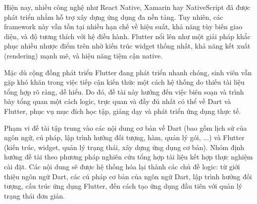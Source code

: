 Hiện nay, nhiều công nghệ như React Native, Xamarin hay NativeScript đã được phát triển nhằm hỗ trợ xây dựng ứng dụng đa nền tảng. Tuy nhiên, các framework này vẫn tồn tại nhiều hạn chế về hiệu suất, khả năng tùy biến giao diện, và độ tương thích với hệ điều hành. Flutter nổi lên như một giải pháp khắc phục nhiều nhược điểm trên nhờ kiến trúc widget thống nhất, khả năng kết xuất (rendering) mạnh mẽ, và hiệu năng tiệm cận native.

Mặc dù cộng đồng phát triển Flutter đang phát triển nhanh chóng, sinh viên vẫn gặp khó khăn trong việc tiếp cận kiến thức một cách hệ thống do thiếu tài liệu tổng hợp rõ ràng, dễ hiểu. Do đó, đề tài này hướng đến việc biên soạn và trình bày tổng quan một cách logic, trực quan và đầy đủ nhất có thể về Dart và Flutter, phục vụ mục đích học tập, giảng dạy và phát triển ứng dụng thực tế.

Phạm vi đề tài tập trung vào các nội dung cơ bản về Dart (bao gồm lịch sử của ngôn ngữ, cú pháp, lập trình hướng đối tượng, hàm, quản lý gói, ...) và Flutter (kiến trúc, widget, quản lý trạng thái, xây dựng ứng dụng cơ bản). Nhóm định hướng đề tài theo phương pháp nghiên cứu tổng hợp tài liệu kết hợp thực nghiệm cài đặt. Các nội dung sẽ được hệ thống hóa lại thành các chủ đề logic: từ giới thiệu ngôn ngữ Dart, các cú pháp cơ bản của ngôn ngữ Dart, lập trình hướng đối tượng, cấu trúc ứng dụng Flutter, đến cách tạo ứng dụng đầu tiên với quản lý trạng thái đơn giản.

